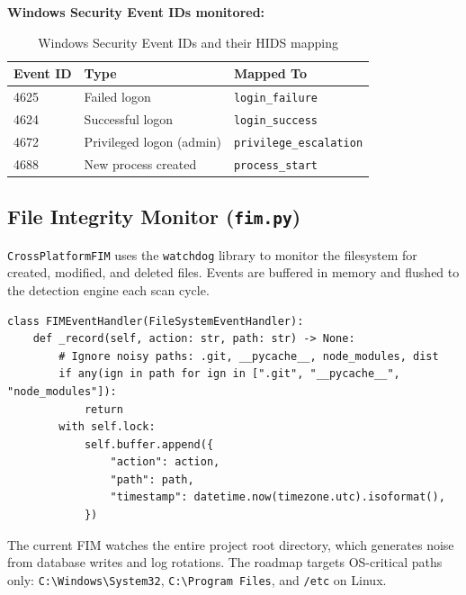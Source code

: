 \documentclass[12pt,a4paper]{article}
\begin{document}
\textbf{Windows Security Event IDs monitored:}

\begin{table}[H]
\centering
\begin{tabular}{lll}
\toprule
\textbf{Event ID} & \textbf{Type} & \textbf{Mapped To} \\
\midrule
4625 & Failed logon & \texttt{login\_failure} \\
4624 & Successful logon & \texttt{login\_success} \\
4672 & Privileged logon (admin) & \texttt{privilege\_escalation} \\
4688 & New process created & \texttt{process\_start} \\
\bottomrule
\end{tabular}
\caption{Windows Security Event IDs and their HIDS mapping}
\end{table}

\subsection{File Integrity Monitor (\texttt{fim.py})}

\texttt{CrossPlatformFIM} uses the \texttt{watchdog} library to monitor the filesystem
for created, modified, and deleted files. Events are buffered in memory and flushed
to the detection engine each scan cycle.

\begin{lstlisting}[style=python, caption={FIM watchdog event handler}]
class FIMEventHandler(FileSystemEventHandler):
    def _record(self, action: str, path: str) -> None:
        # Ignore noisy paths: .git, __pycache__, node_modules, dist
        if any(ign in path for ign in [".git", "__pycache__", "node_modules"]):
            return
        with self.lock:
            self.buffer.append({
                "action": action,
                "path": path,
                "timestamp": datetime.now(timezone.utc).isoformat(),
            })
\end{lstlisting}

\begin{dangerbox}
The current FIM watches the entire project root directory, which generates
noise from database writes and log rotations. The roadmap targets OS-critical
paths only: \texttt{C:\textbackslash{}Windows\textbackslash{}System32},
\texttt{C:\textbackslash{}Program Files}, and \texttt{/etc} on Linux.
\end{dangerbox}
\end{document}
